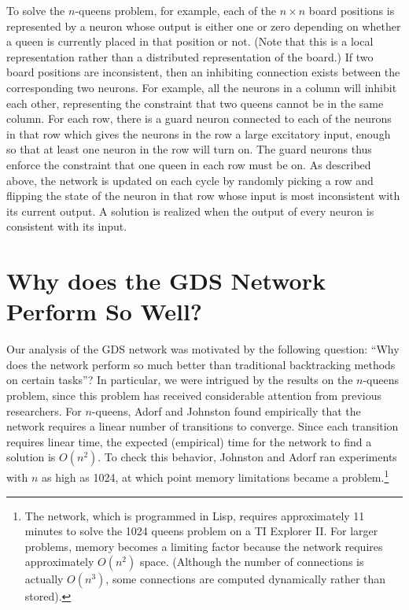   To solve the $n$-queens problem, for example, each of the $n \times n$ board
positions is represented by a neuron whose output is either one or
zero depending on whether a queen is currently placed in that position
or not.  (Note that this is a local representation rather than a
distributed representation of the board.)  If two board positions are
inconsistent, then an inhibiting connection exists between the
corresponding two neurons.  For example, all the neurons in a column
will inhibit each other, representing the constraint that two queens
cannot be in the same column.  For each row, there is a guard neuron
connected to each of the neurons in that row which gives the neurons
in the row a large excitatory input, enough so that at least one
neuron in the row will turn on.  The guard neurons thus enforce the
constraint that one queen in each row must be on.  As described above,
the network is updated on each cycle by randomly picking a row and
flipping the state of the neuron in that row whose input is most
inconsistent with its current output. A solution is realized when the
output of every neuron is consistent with its input.

\section{Why does the GDS Network Perform So Well?}
\label{mv-heuristic}

Our analysis of the GDS network was motivated by the following question:
``Why does the network perform so much better than traditional backtracking
methods on certain tasks''? In particular, we were intrigued by the results
on the $n$-queens problem, since this problem has received considerable
attention from previous researchers.  For $n$-queens, Adorf and Johnston
found empirically that the network requires a linear number of transitions to
converge. Since each transition requires linear time, the expected
(empirical) time for the network to find a solution is $O(n^2)$. To check
this behavior, Johnston and Adorf ran experiments with $n$ as high as 1024,
at which point memory limitations became a problem.\footnote{The network,
which is programmed in Lisp, requires approximately 11 minutes to solve the
1024 queens problem on a TI Explorer II. For larger problems, memory becomes
a limiting factor because the network requires approximately $O(n^{2})$
space.  (Although the number of connections is actually $O(n^{3})$, some
connections are computed dynamically rather than stored).}



